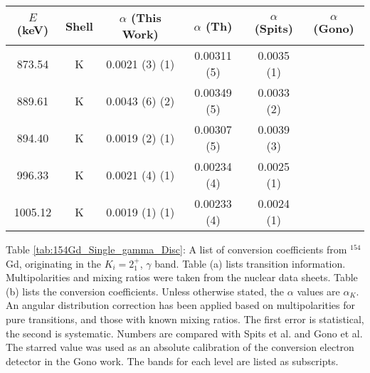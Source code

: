 \begin{table}
    \ContinuedFloat
    \begin{subtable}{\textwidth}
    \end{subtable}
    \begin{ThreePartTable}
    \begin{subtable}{\textwidth}
        \caption{}
        \begin{tabular}{c|c|c|c|c|c}
            \toprule
            $E$ (keV) & Shell &	$\alpha$ (This Work)	&	$\alpha$  (Th)\citep{kibedi08:_BRICC}	&	$\alpha$ (Spits)\citep{spits96:_154gd} & $\alpha$ (Gono)\citep{gono74:_154gd_e0}		\\
            \hline
            873.54	& K &	0.0021	(3)	(1) &	0.00311 (5)	&	0.0035 (1)	\\
            \hline
            889.61	& K &	0.0043	(6) (2)	&	0.00349 (5)	&	0.0033 (2)	\\
            \hline
            894.40	& K &	0.0019	(2) (1)	&	0.00307 (5)	&	0.0039 (3)	\\
            \hline
            996.33	& K &	0.0021	(4) (1)	&	0.00234 (4)	&	0.0025 (1)	\\
            \hline
            1005.12	& K &	0.0019	(1) (1)	&	0.00233 (4)	&	0.0024 (1)	\\
            \bottomrule
        \end{tabular}
        \end{subtable}
        \begin{tablenotes}[para]
            Table \ref{tab:154Gd_Single_gamma_Disc}: A list of conversion coefficients from $^{154}$Gd, originating in the $K_i=2^+_1$, $\gamma$ band. Table (a) lists transition information. Multipolarities and mixing ratios were taken from the nuclear data sheets\citep{reich09:_nds_154}. Table (b) lists the conversion coefficients. Unless otherwise stated, the $\alpha$ values are $\alpha_K$. An angular distribution correction has been applied based on multipolarities for pure transitions, and those with known mixing ratios. The first error is statistical, the second is systematic. Numbers are compared with Spits et al.\citep{spits96:_154gd} and Gono et al.\citep{gono74:_154gd_e0} The starred value was used as an absolute calibration of the conversion electron detector in the Gono work. The bands for each level are listed as subscripts.
        \end{tablenotes}
\end{ThreePartTable}
\end{table}
